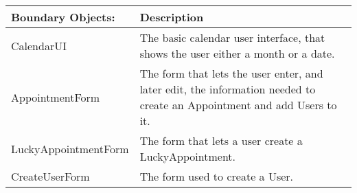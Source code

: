 {\tabulinesep=1.2mm
\begin{tabu}{ | p{6cm} | p{10cm} |}
    \hline
    Boundary Objects: 		& 		Description    \\ \hline
    CalendarUI       		&       The basic calendar user interface, that shows the user either a month or a date.\\\hline
    AppointmentForm  		&       The form that lets the user enter, and later edit, the information needed to create an Appointment and add Users to it.\\\hline
    LuckyAppointmentForm  	&       The form that lets a user create a LuckyAppointment.\\\hline
    CreateUserForm  		&       The form used to create a User.\\\hline
\end{tabu}
}

